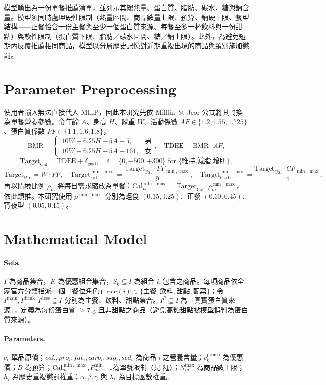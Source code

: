 \documentclass[a4paper]{article}
\begin{document}
模型輸出為一份單餐推薦清單，並列示其總熱量、蛋白質、脂肪、碳水、糖與鈉含量。模型須同時處理硬性限制（熱量區間、商品數量上限、預算、鈉硬上限、餐型結構——正餐恰含一份主餐與至少一個蛋白質來源、每餐至多一杯飲料與一份甜點）與軟性限制（蛋白質下限、脂肪／碳水區間、糖／鈉上限）。此外，為避免短期內反覆推薦相同商品，模型以分層歷史記憶對近期重複出現的商品與類別施加懲罰。

\section{Parameter Preprocessing}\label{sec:pre}
使用者輸入無法直接代入 MILP，因此本研究先依 Mifflin--St Jeor 公式將其轉換為單餐營養參數。令年齡 $A$、身高 $H$、體重 $W$、活動係數 $AF \in \{1.2,1.55,1.725\}$、蛋白質係數 $PF \in \{1.1,1.6,1.8\}$，
\[
\text{BMR} = \begin{cases}10W+6.25H-5A+5, & \text{男}\\10W+6.25H-5A-161, & \text{女}\end{cases},\quad
\text{TDEE} = \text{BMR}\cdot AF,
\]
\[
\text{Target}_{\text{Cal}} = \text{TDEE} + \delta_{\text{goal}}, \quad
\delta = \{0, -500, +300\} \text{ for \{維持,減脂,增肌\}},
\]
\[
\text{Target}_{\text{Pro}} = W \cdot PF, \quad
\text{Target}_{\text{Fat}}^{\min,\max} = \frac{\text{Target}_{\text{Cal}}\cdot FF_{\min,\max}}{9},\quad
\text{Target}_{\text{Carb}}^{\min,\max} = \frac{\text{Target}_{\text{Cal}}\cdot CF_{\min,\max}}{4}.
\]
再以情境比例 $\rho_m$ 將每日需求縮放為單餐：$\text{Cal}^{\min,\max}_m = \text{Target}_{\text{Cal}}\cdot \rho^{\min,\max}_m$，依此類推。本研究使用 $\rho^{\min,\max}$ 分別為輕食 $(0.15,0.25)$、正餐 $(0.30,0.45)$、宵夜型 $(0.05,0.15)$。

\section{Mathematical Model}\label{sec:model}
\paragraph{Sets.}$I$ 為商品集合，$K$ 為優惠組合集合，$S_k\subseteq I$ 為組合 $k$ 包含之商品。每項商品依全家官方分類指派一個「餐位角色」$\mathrm{role}(i)\in\{\text{主餐},\text{飲料},\text{甜點},\text{配菜}\}$；令 $I^{\mathrm{main}}, I^{\mathrm{drink}}, I^{\mathrm{dess}}\subseteq I$ 分別為主餐、飲料、甜點集合。$I^{P}\subseteq I$ 為「真實蛋白質來源」，定義為每份蛋白質 $\ge 7$ g 且非甜點之商品（避免高糖甜點被模型誤判為蛋白質來源）。

\paragraph{Parameters.}$c_i$ 單品原價；$cal_i,pro_i,fat_i,carb_i,sug_i,sod_i$ 為商品 $i$ 之營養含量；$c_k^{\text{promo}}$ 為優惠價；$B$ 為預算；$\text{Cal}^{\min,\max}_m, P^{\min}_m,$ \dots 為單餐限制（見 \S\ref{sec:pre}）；$N^{\max}_m$ 為商品數上限；$h_i$ 為歷史重複懲罰權重；$\alpha,\beta,\gamma$ 與 $\lambda_*$ 為目標函數權重。
\end{document}
